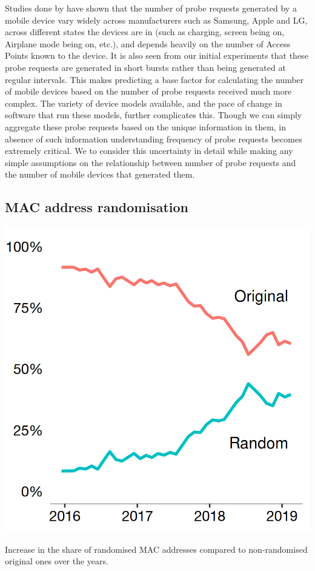 Studies done by \citet{freud2015}\cite{freud2015} have shown that the number of probe requests generated by a mobile device vary widely across manufacturers such as Samsung, Apple and LG, across different states the devices are in (such as charging, screen being on, Airplane mode being on, etc.), and depends heavily on the number of Access Points known to the device.
It is also seen from our initial experiments that these probe requests are generated in short bursts rather than being generated at regular intervals.
This makes predicting a base factor for calculating the number of mobile devices based on the number of probe requests received much more complex.
The variety of device models available, and the pace of change in software that run these models, further complicates this.
Though we can simply aggregate these probe requests based on the unique information in them, in absence of such information understanding frequency of probe requests becomes extremely critical.
We to consider this uncertainty in detail while making any simple assumptions on the relationship between number of probe requests and the number of mobile devices that generated them.

\subsection{MAC address randomisation}

\begin{marginfigure}[4cm]
  \includegraphics{images/mac-randomisation.png}
  \caption{Increase in the share of randomised MAC addresses compared to non-randomised original ones over the years.}
  \label{figure:collection:macrandom}
\end{marginfigure}

